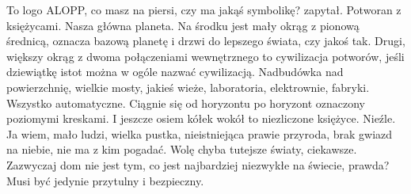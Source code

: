 \begin{dialogue}
\ds{} To logo ALOPP, co masz na piersi, czy ma jakąś symbolikę? \dm{} zapytał.
\ds{} Potworan z księżycami. Nasza główna planeta.
Na środku jest mały okrąg z pionową średnicą, oznacza bazową planetę i drzwi do lepszego świata, czy jakoś tak.
Drugi, większy okrąg z dwoma połączeniami wewnętrznego to cywilizacja potworów, jeśli dziewiątkę istot można w ogóle nazwać cywilizacją.
Nadbudówka nad powierzchnię, wielkie mosty, jakieś wieże, laboratoria, elektrownie, fabryki. Wszystko automatyczne. Ciągnie się od horyzontu po horyzont oznaczony poziomymi kreskami.
I jeszcze osiem kółek wokół to niezliczone księżyce.
\ds{} Nieźle.
\ds{} Ja wiem, mało ludzi, wielka pustka, nieistniejąca prawie przyroda, brak gwiazd na niebie, nie ma z kim pogadać. Wolę chyba tutejsze światy, ciekawsze.
\ds{} Zazwyczaj dom nie jest tym, co jest najbardziej niezwykłe na świecie, prawda? Musi być jedynie przytulny i bezpieczny.
\end{dialogue}

